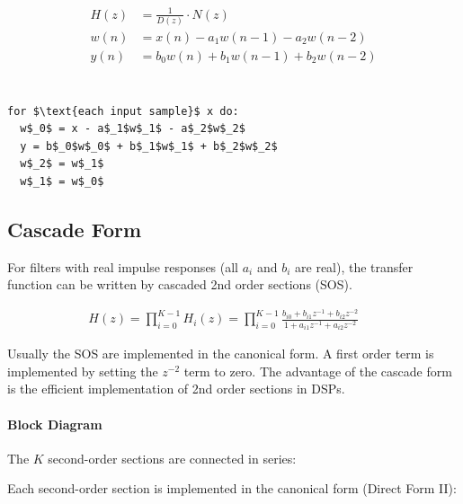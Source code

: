 \begin{align*}
	H(z) &= \frac{1}{D(z)} \cdot N(z) \\
	w(n) &= x(n) - a_1 w(n-1) - a_2 w(n-2) \\
	y(n) &= b_0 w(n) + b_1 w(n-1) + b_2 w(n-2) \\
\end{align*}\\

\begin{center}
	
\end{center}

\begin{lstlisting}[mathescape]
for $\text{each input sample}$ x do:
  w$_0$ = x - a$_1$w$_1$ - a$_2$w$_2$
  y = b$_0$w$_0$ + b$_1$w$_1$ + b$_2$w$_2$
  w$_2$ = w$_1$
  w$_1$ = w$_0$
\end{lstlisting}


\subsection{Cascade Form}
\label{sec:cascadeform}
For filters with real impulse responses (all $a_i$ and $b_i$ are real), the
transfer function can be written by cascaded 2nd order sections (SOS).

\begin{align*}
	H(z) = \prod_{i=0}^{K-1}H_i(z) = \prod_{i=0}^{K-1}\frac
	{b_{i0}+b_{i1}z^{-1}+b_{i2}z^{-2}}
	{1+a_{i1}z^{-1}+a_{i2}z^{-2}} &&
\end{align*}

Usually the SOS are implemented in the canonical form. A first order term is
implemented by setting the $z^{-2}$ term to zero. The advantage of the cascade
form is the efficient implementation of 2nd order sections in DSPs.

\paragraph{Block Diagram}

The $K$ second-order sections are connected in series:


Each second-order section is implemented in the canonical form (Direct Form II):

\begin{center}
    
\end{center}

